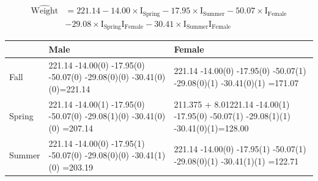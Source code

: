 \documentclass[]{book}
\begin{document}
\[
\begin{aligned}
\widehat{\text{Weight}} &= 221.14 -14.00 \times\text{I}_{\text{Spring}} -17.95\times\text{I}_{\text{Summer}} -50.07\times\text{I}_{\text{Female}} \\
&-29.08\times\text{I}_{\text{Spring}}\text{I}_{\text{Female}} -30.41\times\text{I}_{\text{Summer}}\text{I}_{\text{Female}}
\end{aligned}
\]

\begin{longtable}[]{@{}lll@{}}
\toprule
\begin{minipage}[b]{0.09\columnwidth}\raggedright\strut
\strut
\end{minipage} & \begin{minipage}[b]{0.14\columnwidth}\raggedright\strut
Male\strut
\end{minipage} & \begin{minipage}[b]{0.14\columnwidth}\raggedright\strut
Female\strut
\end{minipage}\tabularnewline
\midrule
\endhead
\begin{minipage}[t]{0.09\columnwidth}\raggedright\strut
Fall\strut
\end{minipage} & \begin{minipage}[t]{0.14\columnwidth}\raggedright\strut
221.14 -14.00(0) -17.95(0) -50.07(0) -29.08(0)(0)
-30.41(0)(0)=221.14\strut
\end{minipage} & \begin{minipage}[t]{0.14\columnwidth}\raggedright\strut
221.14 -14.00(0) -17.95(0) -50.07(1) -29.08(0)(1) -30.41(0)(1)
=171.07\strut
\end{minipage}\tabularnewline
\begin{minipage}[t]{0.09\columnwidth}\raggedright\strut
Spring\strut
\end{minipage} & \begin{minipage}[t]{0.14\columnwidth}\raggedright\strut
221.14 -14.00(1) -17.95(0) -50.07(0) -29.08(1)(0) -30.41(0)(0)
=207.14\strut
\end{minipage} & \begin{minipage}[t]{0.14\columnwidth}\raggedright\strut
211.375 + 8.01221.14 -14.00(1) -17.95(0) -50.07(1) -29.08(1)(1)
-30.41(0)(1)=128.00\strut
\end{minipage}\tabularnewline
\begin{minipage}[t]{0.09\columnwidth}\raggedright\strut
Summer\strut
\end{minipage} & \begin{minipage}[t]{0.14\columnwidth}\raggedright\strut
221.14 -14.00(0) -17.95(1) -50.07(0) -29.08(0)(0) -30.41(1)(0)
=203.19\strut
\end{minipage} & \begin{minipage}[t]{0.14\columnwidth}\raggedright\strut
221.14 -14.00(0) -17.95(1) -50.07(1) -29.08(0)(1) -30.41(1)(1)
=122.71\strut
\end{minipage}\tabularnewline
\bottomrule
\end{longtable}
\end{document}

